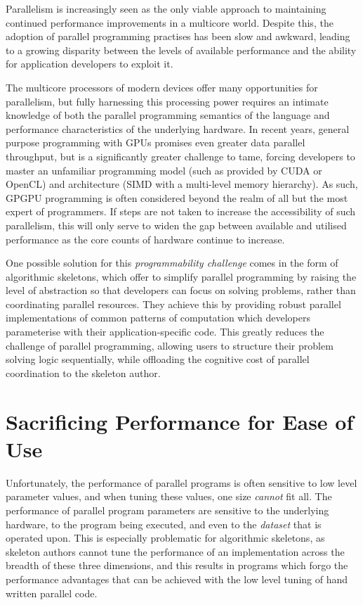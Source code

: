 Parallelism is increasingly seen as the only viable approach to
maintaining continued performance improvements in a multicore world.
Despite this, the adoption of parallel programming practises has been
slow and awkward, leading to a growing disparity between the levels of
available performance and the ability for application developers to
exploit it.

The multicore processors of modern devices offer many opportunities
for parallelism, but fully harnessing this processing power requires
an intimate knowledge of both the parallel programming semantics of
the language and performance characteristics of the underlying
hardware. In recent years, general purpose programming with GPUs
promises even greater data parallel throughput, but is a significantly
greater challenge to tame, forcing developers to master an unfamiliar
programming model (such as provided by CUDA or OpenCL) and
architecture (SIMD with a multi-level memory hierarchy). As such,
GPGPU programming is often considered beyond the realm of all but the
most expert of programmers. If steps are not taken to increase the
accessibility of such parallelism, this will only serve to widen the
gap between available and utilised performance as the core counts of
hardware continue to increase.

One possible solution for this \emph{programmability challenge} comes
in the form of algorithmic skeletons, which offer to simplify parallel
programming by raising the level of abstraction so that developers can
focus on solving problems, rather than coordinating parallel
resources. They achieve this by providing robust parallel
implementations of common patterns of computation which developers
parameterise with their application-specific code. This greatly
reduces the challenge of parallel programming, allowing users to
structure their problem solving logic sequentially, while offloading
the cognitive cost of parallel coordination to the skeleton author.


\section{Sacrificing Performance for Ease of Use}

Unfortunately, the performance of parallel programs is often sensitive
to low level parameter values, and when tuning these values, one size
\emph{cannot} fit all. The performance of parallel program parameters
are sensitive to the underlying hardware, to the program being
executed, and even to the \emph{dataset} that is operated upon. This
is especially problematic for algorithmic skeletons, as skeleton
authors cannot tune the performance of an implementation across the
breadth of these three dimensions, and this results in programs which
forgo the performance advantages that can be achieved with the low
level tuning of hand written parallel code.


